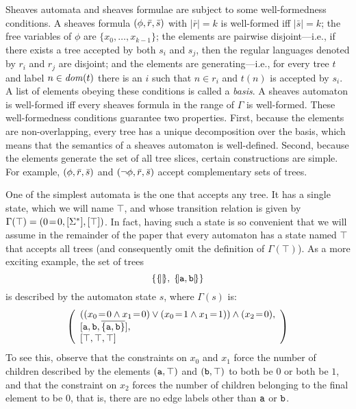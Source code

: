 Sheaves automata and sheaves formulae{} are subject to some well-formedness
conditions. A sheaves formula{} \((\phi, \bar r, \bar s)\) with
\(|\bar r| = k\) is well-formed iff $|\bar s| = k$; the free variables of
\(\phi\) are
%
\(\{x_0,\dots,x_{k-1}\}\); the elements are pairwise disjoint---i.e.,
if there exists a tree accepted by both \(s_i\) and \(s_j\), then the
regular languages denoted by \(r_i\) and \(r_j\) are disjoint; and the
elements are generating---i.e., for every tree \(t\) and label \(n \in \mathit{dom}(t)\)
there is an \(i\) such that \(n \in r_i\) and
\(t(n)\) is accepted by \(s_i\). A list of elements obeying these
conditions is called a \emph{basis}. A sheaves automaton{} is well-formed iff
every sheaves formula{} in the range of \(\Gamma\) is well-formed.
%
These well-formedness conditions guarantee two properties.  First,
because the elements are non-overlapping, every tree has a unique
decomposition over the basis, which means that the semantics of a
sheaves automaton is well-defined. Second, because the elements generate the set
of all tree slices, certain constructions are simple. For example,
\((\phi, \bar r, \bar s)\) and \((\lnot{\phi}, \bar
r, \bar s)\) accept complementary sets of trees.

\newcommand{\PEQUAL}[2]{#1\!=\!#2}
\newcommand{\TRUTH}{\top}
\newcommand{\TRUE}{\TRUTH}
\newcommand{\name}{\Label}
\newcommand{\RNEG}[1]{\overline{#1}}

One of the simplest automata is the one that accepts any tree. It has a
single state, which we will name $\TRUE$, and whose transition relation is
given by $\Gamma(\TRUE)=\FORMULA{\PEQUAL00}{[\Sigma^*]}{[\TRUE]}$. In fact,
having such a state is so convenient that we will assume in the remainder of
the paper that every automaton has a state named $\TRUE$ that accepts all
trees (and consequently omit the definition of $\Gamma(\TRUE)$). As a more
exciting example, the set of trees
\[
\{
\{\hspace{-2pt}||\hspace{-2pt}\} ,\; \{\hspace{-2pt}|\mathtt{a},\mathtt{b}|\hspace{-2pt}\}
\}
\]
is described by the automaton{} state \(s\), where \(\Gamma(s)\) is:
\[
\left(
\begin{array}{l}
((\PEQUAL{x_0}{0} \wedge \PEQUAL{x_1}{0}) \vee (\PEQUAL{x_0}{1} \wedge \PEQUAL{x_1}{1})) \wedge (\PEQUAL{x_2}{0}),\\
{}[\name{a},\name{b},\RNEG{\{\name{a}, \name{b}\}}],\\
{}[\TRUE,\TRUE,\TRUE]
\end{array}
\right)
\]
To see this, observe that the constraints on \(x_0\) and
\(x_1\) force the number of children described by the elements
\(\ELEMENT{\name{a}}{\TRUE}\) and \(\ELEMENT{\name{b}}{\TRUE}\) to
both be \(0\) or both be \(1\), and that the constraint on \(x_2\) forces the
number of children belonging to the final element to be \(0\), that is,
there are no edge labels other than \(\name{a}\) or \(\name{b}\).

